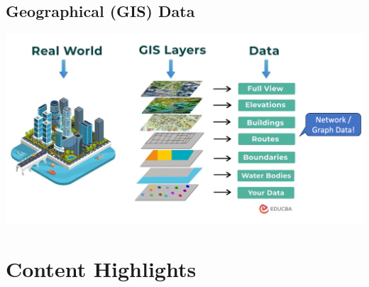 \documentclass[11pt]{article}
\theoremstyle{definition}
\begin{document}
\subsection{Geographical (GIS) Data}
\includegraphics[width = \textwidth]{12.png}
\newpage
\section{Content Highlights}
\end{document}
